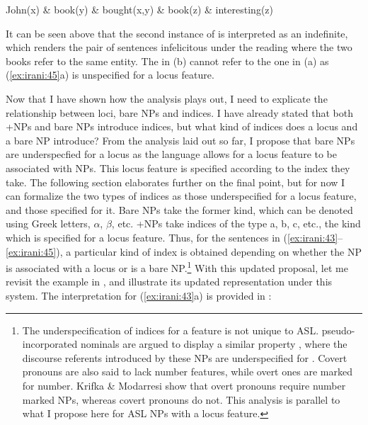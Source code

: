 \documentclass[output=paper,
modfonts
]{langscibook}
\begin{document}
\begin{exe}

\ex\label{ex:irani:56} John(x) \& book(y) \& bought(x,y) \& book(z) \& interesting(z) \par 

\end{exe}

It can be seen above that the second instance of  is interpreted as an indefinite, which renders the pair of sentences infelicitous under the reading where the two books refer to the same entity. The  in (b) cannot refer to the one in (a) as (\ref{ex:irani:45}a) is unspecified for a locus feature. 

Now that I have shown how the analysis plays out, I need to explicate the relationship between loci, bare NPs and indices. I have already stated that both +NPs and bare NPs introduce indices, but what kind of indices does a locus and a bare NP introduce? From the analysis laid out so far, I propose that bare NPs are underspecfied for a locus as the language allows for a locus feature to be associated with NPs. This locus feature is specified according to the index they take. The following section elaborates further on the final point, but for now I can formalize the two types of indices as those underspecified for a locus feature, and those specified for it. Bare NPs take the former kind, which can be denoted using Greek letters, \(\alpha\), \(\beta\), etc. +NPs take indices of the type a, b, c, etc., the kind which is specified for a locus feature. Thus, for the sentences in (\ref{ex:irani:43}--\ref{ex:irani:45}), a particular kind of index is obtained depending on whether the NP is associated with a locus or is a bare NP.\footnote{The underspecification of indices for a feature is not unique to ASL.  pseudo-incorporated nominals are argued to display a similar property \citep{KrifkaModarresi2016}, where the discourse referents introduced by these NPs are underspecified for . Covert pronouns are also said to lack number features, while overt ones are marked for number. Krifka \& Modarresi show that overt pronouns require number marked NPs, whereas covert pronouns do not. This analysis is parallel to what I propose here for ASL NPs with a locus feature.} With this updated proposal, let me revisit the example in , and illustrate its updated representation under this system. The interpretation for (\ref{ex:irani:43}a) is provided in :  
\end{document}
